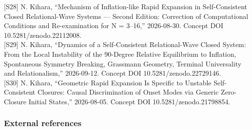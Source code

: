\documentclass[
  a4paper,
]{article}
\begin{document}
{[}S28{]} N. Kihara, ``Mechanism of Inflation-like Rapid Expansion in
Self-Consistent Closed Relational-Wave Systems --- Second Edition:
Correction of Computational Conditions and Re-examination for N =
3--16,'' 2026-08-30. Concept DOI 10.5281/zenodo.22112008.\\
{[}S29{]} N. Kihara, ``Dynamics of a Self-Consistent Relational-Wave
Closed System: From the Local Instability of the 90-Degree Relative
Equilibrium to Inflation, Spontaneous Symmetry Breaking, Grassmann
Geometry, Terminal Universality and Relationalism,'' 2026-09-12. Concept
DOI 10.5281/zenodo.22729146.\\
{[}S30{]} N. Kihara, ``Geometric Rapid Expansion Is Specific to Unstable
Self-Consistent Closures: Causal Discrimination of Onset Modes via
Generic Zero-Closure Initial States,'' 2026-08-05. Concept DOI
10.5281/zenodo.21798854.

\subsubsection{External references}\label{external-references}
\end{document}
